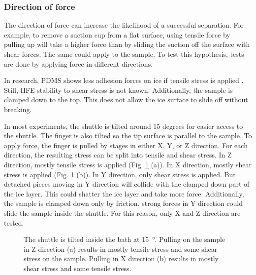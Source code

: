 \FloatBarrier

\subsubsection{Direction of force}

The direction of force can increase the likelihood of a successful separation. For example, to remove a suction cup from a flat surface, using tensile force by pulling up will take a higher force than by sliding the suction off the surface with shear forces. The same could apply to the sample. To test this hypothesis, tests are done by applying force in different directions.

In research, PDMS shows less adhesion forces on ice if tensile stress is applied \cite{IbanezIbanez.2022}. Still, HFE stability to shear stress is not known. Additionally, the sample is clamped down to the top. This does not allow the ice surface to slide off without breaking.




In most experiments, the shuttle is tilted around 15 degrees for easier access to the shuttle. The finger is also tilted so the tip surface is parallel to the sample. To apply force, the finger is pulled by stages in either X, Y, or Z direction. For each direction, the resulting stress can be split into tensile and shear stress. In Z direction, mostly tensile stress is applied (Fig. \ref{fig:tensilevsshear} (a)). In X direction, mostly shear stress is applied (Fig. \ref{fig:tensilevsshear} (b)). In Y direction, only shear stress is applied. But detached pieces moving in Y direction will collide with the clamped down part of the ice layer. This could shatter the ice layer and take more force. Additionally, the sample is clamped down only by friction, strong forces in Y direction could slide the sample inside the shuttle. For this reason, only X and Z direction are tested.

\begin{figure}[hbt!]
	\centering
	
	\caption{The shuttle is tilted inside the bath at \SI{15}{\degree}. Pulling on the sample in Z direction (a) results in mostly tensile stress and some shear stress on the sample. Pulling in X direction (b) results in mostly shear stress and some tensile stress.}
	\label{fig:tensilevsshear}
\end{figure}

